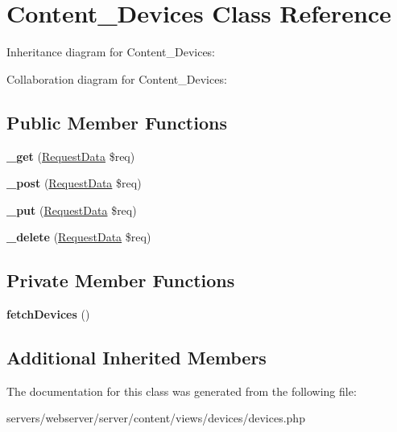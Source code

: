 \hypertarget{class_lora_1_1_content_1_1_content___devices}{}\section{Content\+\_\+\+Devices Class Reference}
\label{class_lora_1_1_content_1_1_content___devices}


Inheritance diagram for Content\+\_\+\+Devices\+:


Collaboration diagram for Content\+\_\+\+Devices\+:
\subsection*{Public Member Functions}
\begin{DoxyCompactItemize}
\item 
\mbox{\label{class_lora_1_1_content_1_1_content___devices_a3ad4bf1b146a3180b34d1327ff2abf69}} 
{\bfseries \+\_\+get} (\hyperlink{class_request_data}{Request\+Data} \$req)
\item 
\mbox{\label{class_lora_1_1_content_1_1_content___devices_a50751d47a139282d1c3b08cab1b6562e}} 
{\bfseries \+\_\+post} (\hyperlink{class_request_data}{Request\+Data} \$req)
\item 
\mbox{\label{class_lora_1_1_content_1_1_content___devices_a2affcc8f31c13147c33450193b229194}} 
{\bfseries \+\_\+put} (\hyperlink{class_request_data}{Request\+Data} \$req)
\item 
\mbox{\label{class_lora_1_1_content_1_1_content___devices_ab8ddc6de1e04524212f7d55893f78864}} 
{\bfseries \+\_\+delete} (\hyperlink{class_request_data}{Request\+Data} \$req)
\end{DoxyCompactItemize}
\subsection*{Private Member Functions}
\begin{DoxyCompactItemize}
\item 
\mbox{\label{class_lora_1_1_content_1_1_content___devices_a1a64aa34a50476a8b7e6db0a17fb4975}} 
{\bfseries fetch\+Devices} ()
\end{DoxyCompactItemize}
\subsection*{Additional Inherited Members}


The documentation for this class was generated from the following file\+:\begin{DoxyCompactItemize}
\item 
servers/webserver/server/content/views/devices/devices.\+php\end{DoxyCompactItemize}
